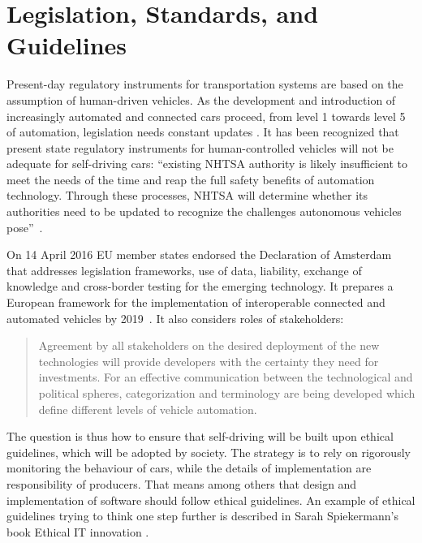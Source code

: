 \section{Legislation, Standards, and Guidelines}
\label{sec:LegislationStandardGuidelines}

Present-day regulatory instruments for transportation systems are based on the assumption of human-driven vehicles. As the development and introduction of increasingly automated and connected cars proceed, from level 1 towards level 5 of automation, legislation needs constant updates \cite{EthicsCommission2017pr,EthicsCommission2017b,Pillath2016,NHTSA2016PolicyUpdate}. It has been recognized that present state regulatory instruments for human-controlled vehicles will not be adequate for self-driving cars:  \enquote{existing NHTSA authority is likely insufficient to meet the needs of the time and reap the full safety benefits of automation technology. Through these processes, NHTSA will determine whether its authorities need to be updated to recognize the challenges autonomous vehicles pose}~\cite{NHTSA2016PolicyUpdate}. %

On 14 April 2016 EU member states endorsed the Declaration of Amsterdam \cite{GovernmentNL2017} that addresses legislation frameworks, use of data, liability, exchange of knowledge and cross-border testing for the emerging technology. It prepares a European framework for the implementation of interoperable connected and automated vehicles by 2019~\cite{EthicsCommission2017b}. It also considers roles of stakeholders:

 \begin{quote}
 Agreement by all stakeholders on the desired deployment of the new technologies will provide developers with the certainty they need for investments. For an effective communication between the technological and political spheres, categorization and terminology are being developed which define different levels of vehicle automation. \cite{Pillath2016} %
 \end{quote} %
 
The question is thus how to ensure that self-driving will be built upon ethical guidelines, which will be adopted by society. The strategy is to rely on rigorously monitoring the behaviour of cars, while the details of implementation are responsibility of producers. That means among others that design and implementation of software should follow ethical guidelines. An example of ethical guidelines trying to think one step further is described in Sarah Spiekermann's book Ethical IT innovation \cite{spiekermann2015ethical}. 

